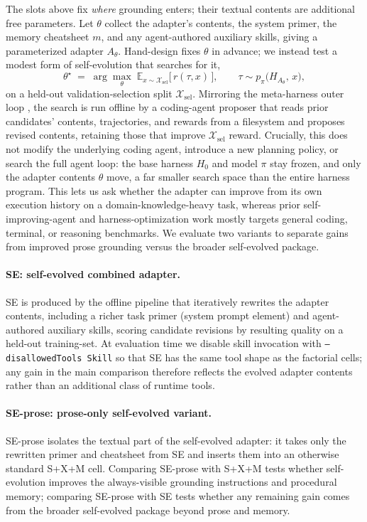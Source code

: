 \documentclass{article}
\begin{document}
The slots above fix \emph{where} grounding enters; their textual contents are additional free parameters. Let $\theta$ collect the adapter's contents, the system primer, the memory cheatsheet $m$, and any agent-authored auxiliary skills, giving a parameterized adapter $A_\theta$. Hand-design fixes $\theta$ in advance; we instead test a modest form of self-evolution that searches for it,
\begin{equation}
\theta^\star \;=\; \arg\max_{\theta}\; \mathbb{E}_{x\sim\mathcal{X}_{\mathrm{sel}}}\big[\,r(\tau,x)\,\big], \qquad \tau \sim p_\pi\big(H_{A_\theta},\, x\big),
\label{eq:selfevolve}
\end{equation}
on a held-out validation-selection split $\mathcal{X}_{\mathrm{sel}}$. Mirroring the meta-harness outer loop \citep{lee2026metaharness}, the search is run offline by a coding-agent proposer that reads prior candidates' contents, trajectories, and rewards from a filesystem and proposes revised contents, retaining those that improve $\mathcal{X}_{\mathrm{sel}}$ reward. Crucially, this does not modify the underlying coding agent, introduce a new planning policy, or search the full agent loop: the base harness $H_0$ and model $\pi$ stay frozen, and only the adapter contents $\theta$ move, a far smaller search space than the entire harness program. This lets us ask whether the adapter can improve from its own execution history on a domain-knowledge-heavy task, whereas prior self-improving-agent and harness-optimization work mostly targets general coding, terminal, or reasoning benchmarks. We evaluate two variants to separate gains from improved prose grounding versus the broader self-evolved package.

\paragraph{SE: self-evolved combined adapter.} SE is produced by the offline pipeline that iteratively rewrites the adapter contents, including a richer task primer (system prompt element) and agent-authored auxiliary skills, scoring candidate revisions by resulting quality on a held-out training-set. At evaluation time we disable skill invocation with \texttt{--disallowedTools Skill} so that SE has the same tool shape as the factorial cells; any gain in the main comparison therefore reflects the evolved adapter contents rather than an additional class of runtime tools.

\paragraph{SE-prose: prose-only self-evolved variant.} SE-prose isolates the textual part of the self-evolved adapter: it takes only the rewritten primer and cheatsheet from SE and inserts them into an otherwise standard S+X+M cell. Comparing SE-prose with S+X+M tests whether self-evolution improves the always-visible grounding instructions and procedural memory; comparing SE-prose with SE tests whether any remaining gain comes from the broader self-evolved package beyond prose and memory.
\end{document}
